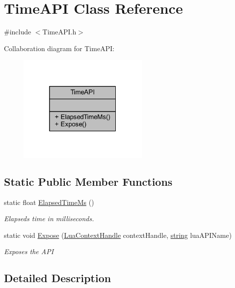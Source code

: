\hypertarget{class_time_a_p_i}{}\section{Time\+A\+PI Class Reference}
\label{class_time_a_p_i}


{\ttfamily \#include $<$Time\+A\+P\+I.\+h$>$}



Collaboration diagram for Time\+A\+PI\+:\nopagebreak
\begin{figure}[H]
\begin{center}
\leavevmode
\includegraphics[width=181pt]{class_time_a_p_i__coll__graph}
\end{center}
\end{figure}
\subsection*{Static Public Member Functions}
\begin{DoxyCompactItemize}
\item 
static float \hyperlink{class_time_a_p_i_ac4462441fc5177c90da58e96c1b3f10d}{Elapsed\+Time\+Ms} ()
\begin{DoxyCompactList}\small\item\em Elapseds time in milliseconds. \end{DoxyCompactList}\item 
static void \hyperlink{class_time_a_p_i_aa82519375637b8094589de2d7ce378db}{Expose} (\hyperlink{_lua_context_8h_a2ffcc2d3ed21165072a1d7b61259bf14}{Lua\+Context\+Handle} context\+Handle, \hyperlink{_types_8h_ad453f9f71ce1f9153fb748d6bb25e454}{string} lua\+A\+P\+I\+Name)
\begin{DoxyCompactList}\small\item\em Exposes the A\+PI \end{DoxyCompactList}\end{DoxyCompactItemize}


\subsection{Detailed Description}


